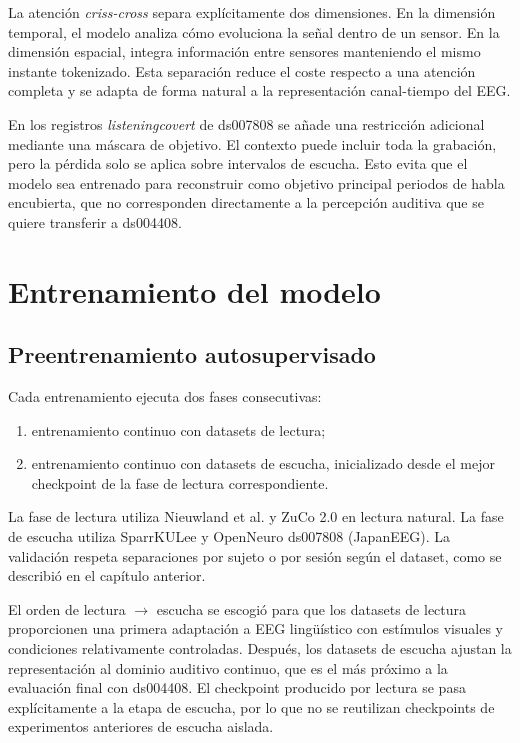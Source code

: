 La atención \textit{criss-cross} separa explícitamente dos dimensiones. En la dimensión temporal, el modelo analiza cómo evoluciona la señal dentro de un sensor. En la dimensión espacial, integra información entre sensores manteniendo el mismo instante tokenizado. Esta separación reduce el coste respecto a una atención completa y se adapta de forma natural a la representación canal-tiempo del EEG.

En los registros \textit{listeningcovert} de ds007808 se añade una restricción adicional mediante una máscara de objetivo. El contexto puede incluir toda la grabación, pero la pérdida solo se aplica sobre intervalos de escucha. Esto evita que el modelo sea entrenado para reconstruir como objetivo principal periodos de habla encubierta, que no corresponden directamente a la percepción auditiva que se quiere transferir a ds004408.

\section{Entrenamiento del modelo}

\subsection{Preentrenamiento autosupervisado}

Cada entrenamiento ejecuta dos fases consecutivas:

\begin{enumerate}
\setlength{\itemsep}{0pt}
\setlength{\parsep}{0pt}
\setlength{\topsep}{2pt}
\setlength{\partopsep}{0pt}
\item entrenamiento continuo con datasets de lectura;
\item entrenamiento continuo con datasets de escucha, inicializado desde el mejor checkpoint de la fase de lectura correspondiente.
\end{enumerate}

La fase de lectura utiliza Nieuwland et al. y ZuCo 2.0 en lectura natural. La fase de escucha utiliza SparrKULee y OpenNeuro ds007808 (JapanEEG). La validación respeta separaciones por sujeto o por sesión según el dataset, como se describió en el capítulo anterior.

El orden de lectura $\rightarrow$ escucha se escogió para que los datasets de lectura proporcionen una primera adaptación a EEG lingüístico con estímulos visuales y condiciones relativamente controladas. Después, los datasets de escucha ajustan la representación al dominio auditivo continuo, que es el más próximo a la evaluación final con ds004408. El checkpoint producido por lectura se pasa explícitamente a la etapa de escucha, por lo que no se reutilizan checkpoints de experimentos anteriores de escucha aislada.


